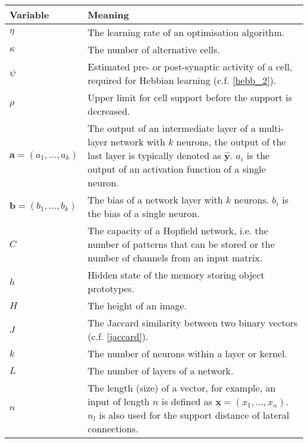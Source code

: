 \begin{tabular}{ p{3cm} p{11cm} }
	\textbf{Variable} & \textbf{Meaning}\\
	\hline
	$\eta$ & The learning rate of an optimisation algorithm.\\
    $\kappa$ & The number of alternative cells.\\
    $\psi$ & Estimated pre- or post-synaptic activity of a cell, required for Hebbian learning (c.f. \eqref{hebb_2}).\\
    $\rho$ & Upper limit for cell support before the support is decreased.\\
	$\boldsymbol{a} = (a_1, ..., a_k)$ & The output of an intermediate layer of a multi-layer network with $k$ neurons, the output of the last layer is typically denoted as $\boldsymbol{\hat{y}}$. $a_i$ is the output of an activation function of a single neuron.\\
	$\boldsymbol{b} = (b_1, ..., b_k)$ & The bias of a network layer with 
    $k$ neurons. $b_i$ is the bias of a single neuron.\\
    $C$ & The capacity of a Hopfield network, i.e. the number of patterns that can be stored or the number of channels from an input matrix.\\
    $h$ & Hidden state of the memory storing object prototypes.\\
    $H$ & The height of an image.\\
    $J$ & The Jaccard similarity between two binary vectors (c.f. \eqref{jaccard}).\\
    $k$ & The number of neurons within a layer or kernel.\\
    $L$ & The number of layers of a network.\\
    $n$ & The length (size) of a vector, for example, an input of length $n$ is defined as $\boldsymbol{x} = (x_1, ..., x_n)$. $n_l$ is also used for the support distance of lateral connections.\\


 \end{tabular}
 
